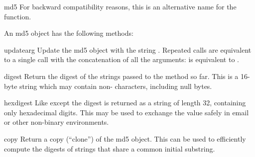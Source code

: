 \begin{funcdesc}{md5}{}
For backward compatibility reasons, this is an alternative name for the
 function.
\end{funcdesc}

An md5 object has the following methods:

\begin{methoddesc}[md5]{update}{arg}
Update the md5 object with the string .  Repeated calls are
equivalent to a single call with the concatenation of all the
arguments:  is equivalent to
.
\end{methoddesc}

\begin{methoddesc}[md5]{digest}{}
Return the digest of the strings passed to the 
method so far.  This is a 16-byte string which may contain
non-\ASCII{} characters, including null bytes.
\end{methoddesc}

\begin{methoddesc}[md5]{hexdigest}{}
Like  except the digest is returned as a string of
length 32, containing only hexadecimal digits.  This may 
be used to exchange the value safely in email or other non-binary
environments.
\end{methoddesc}

\begin{methoddesc}[md5]{copy}{}
Return a copy (``clone'') of the md5 object.  This can be used to
efficiently compute the digests of strings that share a common initial
substring.
\end{methoddesc}


\begin{seealso}
\end{seealso}
